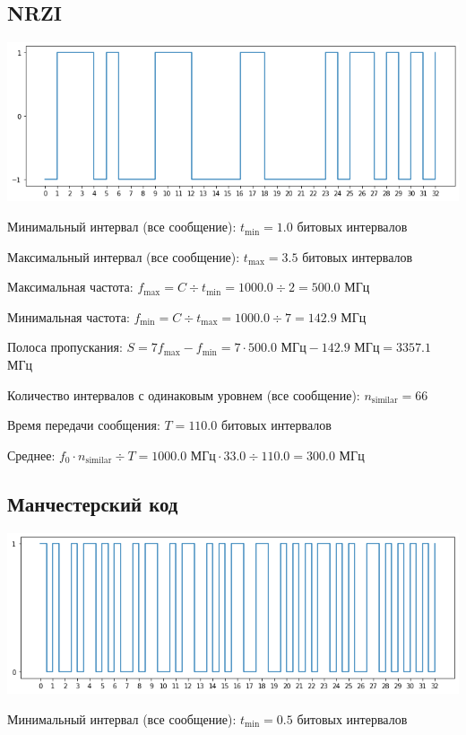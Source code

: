 \subsection{NRZI}
\includegraphics[width=\textwidth]{2nrzi}

Минимальный интервал (все сообщение): $t_\mathrm{min}=1.0$ битовых интервалов

Максимальный интервал (все сообщение): $t_\mathrm{max}=3.5$ битовых интервалов

Максимальная частота: $f_\mathrm{max}=C\div t_\mathrm{min}=1000.0\div 2=500.0$ МГц

Минимальная частота: $f_\mathrm{min}=C\div t_\mathrm{max}=1000.0\div 7=142.9$ МГц

Полоса пропускания: $S=7f_\mathrm{max}-f_\mathrm{min} = 7\cdot 500.0\text{ МГц}-142.9\text{ МГц}=3357.1$ МГц

Количество интервалов с одинаковым уровнем (все сообщение): $n_\mathrm{similar}=66$

Время передачи сообщения: $T=110.0$ битовых интервалов

Среднее: $f_0\cdot n_\mathrm{similar}\div T=1000.0\text{ МГц}\cdot 33.0\div 110.0=300.0$ МГц

\subsection{Манчестерский код}
\includegraphics[width=\textwidth]{2manchester}

Минимальный интервал (все сообщение): $t_\mathrm{min}=0.5$ битовых интервалов

